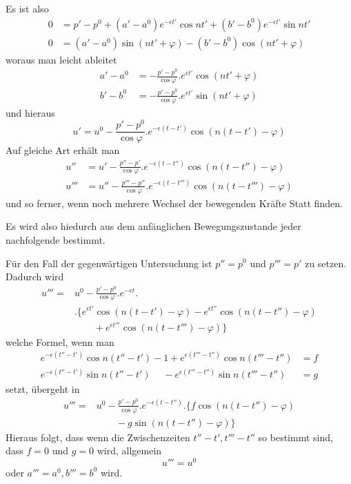Es ist also
\[
\begin{aligned}
0&=p'-p^0+(a'-a^0)e^{-\epsilon t'}\cos nt'+(b'-b^0)e^{-\epsilon t'}\sin nt'\\
0&=(a'-a^0)\sin(nt'+\varphi)-(b'-b^0)\cos(nt'+\varphi)
\end{aligned}
\]
woraus man leicht ableitet
\[
\begin{aligned}
a'-a^0&=-\frac{p'-p^0}{\cos\varphi}.e^{\epsilon t'}\cos(nt'+\varphi)\\
b'-b^0&=-\frac{p'-p^0}{\cos\varphi}.e^{\epsilon t'}\sin(nt'+\varphi)
\end{aligned}
\]
und hieraus
\[
u'=u^0-\frac{p'-p^0}{\cos\varphi}.e^{-\epsilon(t-t')}\cos(n(t-t')-\varphi)
\]
Auf gleiche Art erhält man
\[
\begin{aligned}
u''&=u'-\frac{p''-p'}{\cos\varphi}.e^{-\epsilon(t-t'')}\cos(n(t-t'')-\varphi)\\
u'''&=u''-\frac{p'''-p''}{\cos\varphi}.e^{-\epsilon(t-t''')}\cos(n(t-t''')-\varphi)
\end{aligned}
\]
und so ferner, wenn noch mehrere Wechsel der bewegenden Kräfte Statt finden.

Es wird also hiedurch aus dem anfänglichen Bewegungszustande jeder nachfolgende bestimmt.

Für den Fall der gegenwärtigen Untersuchung ist $p''=p^0$ und $p'''=p'$ zu setzen. Dadurch wird
\[
\begin{aligned}
u'''={}&u^0-\frac{p'-p^0}{\cos\varphi}.e^{-\epsilon t}.\\
&.\{e^{\epsilon t'}\cos(n(t-t')-\varphi)-e^{\epsilon t''}\cos(n(t-t'')-\varphi)\\
&\qquad+e^{\epsilon t'''}\cos(n(t-t''')-\varphi)\}
\end{aligned}
\]
welche Formel, wenn man
\[
\begin{aligned}
e^{-\epsilon(t''-t')}\cos n(t''-t')-1+e^{\epsilon(t'''-t'')}\cos n(t'''-t'')&=f\\
e^{-\epsilon(t''-t')}\sin n(t''-t')\phantom{-1}{}-e^{\epsilon(t'''-t'')}\sin n(t'''-t'')&=g
\end{aligned}
\]
setzt, übergeht in
\[
\begin{aligned}
u'''={}&u^0-\frac{p'-p^0}{\cos\varphi}.e^{-\epsilon(t-t'')}.\{f\cos(n(t-t'')-\varphi)\\
&\qquad-g\sin(n(t-t'')-\varphi)\}
\end{aligned}
\]
Hieraus folgt, dass wenn die Zwischenzeiten $t''-t',t'''-t''$ so bestimmt sind, dass $f=0$ und $g=0$ wird, allgemein
\[
u'''=u^0
\]
oder $a'''=a^0,b'''=b^0$ wird.

